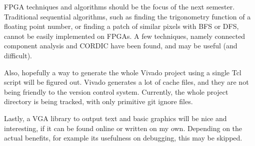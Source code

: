 \documentclass{IEEEtran}
\begin{document}
	FPGA techniques and algorithms should be the focus of the next semester. Traditional sequential algorithms, such as finding the trigonometry function of a floating point number, or finding a patch of similar pixels with BFS or DFS, cannot be easily implemented on FPGAs. A few techniques, namely connected component analysis \cite{cca} and CORDIC have been found, and may be useful (and difficult).
	
	Also, hopefully a way to generate the whole Vivado project using a single Tcl script will be figured out. Vivado generates a lot of cache files, and they are not being friendly to the version control system. Currently, the whole project directory is being tracked, with only primitive git ignore files.
	
	Lastly, a VGA library to output text and basic graphics will be nice and interesting, if it can be found online or written on my own. Depending on the actual benefits, for example its usefulness on debugging, this may be skipped.
\end{document}

